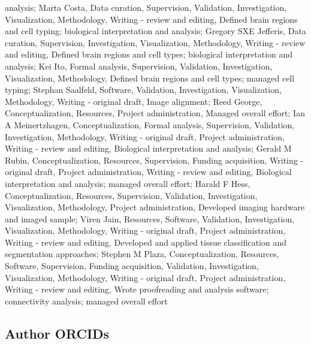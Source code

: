 \documentclass{article}
\begin{document}
analysis; Marta Costa, Data curation, Supervision, Validation, Investigation, Visualization, Methodology, Writing - review and editing, Defined brain regions and cell typing; biological interpretation and analysis; Gregory SXE Jefferis, Data curation, Supervision, Investigation, Visualization, Methodology, Writing - review and editing, Defined brain regions and cell types; biological interpretation and analysis; Kei Ito, Formal analysis, Supervision, Validation, Investigation, Visualization, Methodology, Defined brain regions and cell types; managed cell typing; Stephan Saalfeld, Software, Validation, Investigation, Visualization, Methodology, Writing - original draft, Image alignment; Reed George, Conceptualization, Resources, Project administration, Managed overall effort; Ian A Meinertzhagen, Conceptualization, Formal analysis, Supervision, Validation, Investigation, Methodology, Writing - original draft, Project administration, Writing - review and editing, Biological interpretation and analysis; Gerald M Rubin, Conceptualization, Resources, Supervision, Funding acquisition, Writing - original draft, Project administration, Writing - review and editing, Biological interpretation and analysis; managed overall effort; Harald F Hess, Conceptualization, Resources, Supervision, Validation, Investigation, Visualization, Methodology, Project administration, Developed imaging hardware and imaged sample; Viren Jain, Resources, Software, Validation, Investigation, Visualization, Methodology, Writing - original draft, Project administration, Writing - review and editing, Developed and applied tissue classification and segmentation approaches; Stephen M Plaza, Conceptualization, Resources, Software, Supervision, Funding acquisition, Validation, Investigation, Visualization, Methodology, Writing - original draft, Project administration, Writing - review and editing, Wrote proofreading and analysis software; connectivity analysis; managed overall effort

\subsection*{Author ORCIDs}
\end{document}
